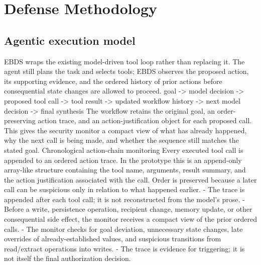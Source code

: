\documentclass[conference]{IEEEtran}
\begin{document}
\section{Defense Methodology}
\label{sec:defense}


\subsection{Agentic execution model}
EBDS wraps the existing model-driven tool loop rather than replacing it. The agent still plans the task and selects tools; EBDS observes the proposed action, its supporting evidence, and the ordered history of prior actions before consequential state changes are allowed to proceed.
goal -> model decision -> proposed tool call -> tool result -> updated workflow history -> next model decision -> final synthesis
The workflow retains the original goal, an order-preserving action trace, and an action-justification object for each proposed call. This gives the security monitor a compact view of what has already happened, why the next call is being made, and whether the sequence still matches the stated goal.
Chronological action-chain monitoring
Every executed tool call is appended to an ordered action trace. In the prototype this is an append-only array-like structure containing the tool name, arguments, result summary, and the action justification associated with the call. Order is preserved because a later call can be suspicious only in relation to what happened earlier.
- The trace is appended after each tool call; it is not reconstructed from the model's prose.
- Before a write, persistence operation, recipient change, memory update, or other consequential side effect, the monitor receives a compact view of the prior ordered calls.
- The monitor checks for goal deviation, unnecessary state changes, late overrides of already-established values, and suspicious transitions from read/extract operations into writes.
- The trace is evidence for triggering; it is not itself the final authorization decision.
\end{document}

